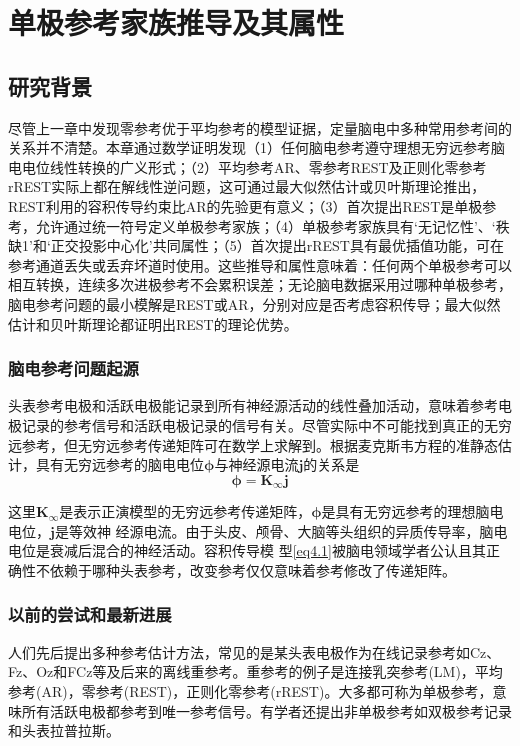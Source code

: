 \chapter{单极参考家族推导及其属性}
\section{研究背景}
尽管上一章中发现零参考优于平均参考的模型证据，定量脑电中多种常用参考间的关系并不清楚。本章通过数学证明发现（1）任何脑电参考遵守理想无穷远参考脑电电位线性转换的广义形式；（2）平均参考AR、零参考REST及正则化零参考rREST实际上都在解线性逆问题，这可通过最大似然估计或贝叶斯理论推出，REST利用的容积传导约束比AR的先验更有意义；（3）首次提出REST是单极参考，允许通过统一符号定义单极参考家族；（4）单极参考家族具有‘无记忆性’、‘秩缺1’和‘正交投影中心化’共同属性；（5）首次提出rREST具有最优插值功能，可在参考通道丢失或丢弃坏道时使用。这些推导和属性意味着：任何两个单极参考可以相互转换，连续多次进极参考不会累积误差；无论脑电数据采用过哪种单极参考，脑电参考问题的最小模解是REST或AR，分别对应是否考虑容积传导；最大似然估计和贝叶斯理论都证明出REST的理论优势。

\subsection{脑电参考问题起源}
头表参考电极和活跃电极能记录到所有神经源活动的线性叠加活动，意味着参考电极记录的参考信号和活跃电极记录的信号有关。尽管实际中不可能找到真正的无穷远参考，但无穷远参考传递矩阵可在数学上求解到。根据麦克斯韦方程的准静态估计，具有无穷远参考的脑电电位$\mathbf{\phi}$与神经源电流$\mathbf{j}$的关系是
\begin{equation}\label{eq4.1}
\mathbf{\phi}=\mathbf{K}_{\infty}\mathbf{j}
\end{equation}

这里$\mathbf{K}_\infty$是表示正演模型的无穷远参考传递矩阵，$\mathbf{\phi}$是具有无穷远参考的理想脑电电位，$\mathbf{j}$是等效神
经源电流。由于头皮、颅骨、大脑等头组织的异质传导率，脑电电位是衰减后混合的神经活动。容积传导模
型\eqref{eq4.1}被脑电领域学者公认且其正确性不依赖于哪种头表参考，改变参考仅仅意味着参考修改了传递矩阵。

\subsection{以前的尝试和最新进展}
人们先后提出多种参考估计方法，常见的是某头表电极作为在线记录参考如Cz、Fz、Oz和FCz等及后来的离线重参考。重参考的例子是连接乳突参考(LM)，平均参考(AR)，零参考(REST)，正则化零参考(rREST)。大多都可称为单极参考，意味所有活跃电极都参考到唯一参考信号。有学者还提出非单极参考如双极参考记录和头表拉普拉斯。

